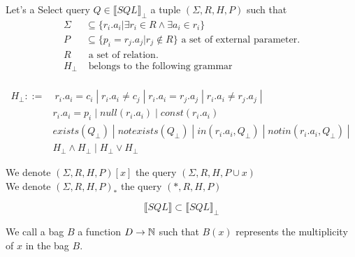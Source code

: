 \begin{mydef}
Let's a Select query $Q \in \llbracket SQL\rrbracket _\bot$ a tuple $(\Sigma,R,H,P)$ such that
\begin{align*}
\Sigma & \subseteq \{r_i.a_i | \exists r_i \in R \land \exists a_i \in r_i \} \\
P & \subseteq \{p_i = r_j.a_j | r_j \notin R\} \mbox{ a set of external parameter.}\\
R & \mbox{ a set of relation.}\\
H_\bot &  \mbox{ belongs to the following grammar}\\
\end{align*}

\begin{align*}
H_{\bot} ::= &\ r_i.a_i = c_i \; |\; r_i.a_i \neq c_j \; |\; r_i.a_i = r_j.a_j \; |\;  r_i.a_i \neq r_j.a_j \; |
\\&  r_i.a_i = p_i\; |\; null(r_i.a_i) \; |\;  const(r_i.a_i)\;
\\ &  exists(Q_{\bot}) \; |\; notexists(Q_{\bot}) \; |\; in(r_i.a_i,Q_{\bot}) \; |\; notin(r_i.a_i,Q_{\bot}) \; |\; 
\\ & H_{\bot}\land H_{\bot} \; |\; H_{\bot} \lor H_{\bot} 
\end{align*}

\end{mydef}

We denote $(\Sigma,R,H,P)[x]$ the query $(\Sigma,R,H,P\cup x)$
\\We denote $(\Sigma,R,H,P)_*$ the query $(*,R,H,P)$

\begin{myprop}
	$$\llbracket SQL\rrbracket \subset \llbracket SQL\rrbracket _\bot$$
\end{myprop}

\begin{mydef}
	We call a bag $B$ a function $D \rightarrow \mathbb{N}$ such that $B(x)$ represents the multiplicity of $x$ in the bag $B$.  
\end{mydef}

